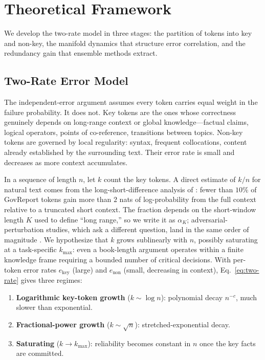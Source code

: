 \section{Theoretical Framework}
\label{sec:framework}

We develop the two-rate model in three stages: the partition of tokens into key and non-key, the manifold dynamics that structure error correlation, and the redundancy gain that ensemble methods extract.

\subsection{Two-Rate Error Model}

The independent-error argument assumes every token carries equal weight in the failure probability. It does not. Key tokens are the ones whose correctness genuinely depends on long-range context or global knowledge---factual claims, logical operators, points of co-reference, transitions between topics. Non-key tokens are governed by local regularity: syntax, frequent collocations, content already established by the surrounding text. Their error rate is small and decreases as more context accumulates.

In a sequence of length $n$, let $k$ count the key tokens. A direct estimate of $k/n$ for natural text comes from the long-short-difference analysis of \citet{fang2024what}: fewer than $10\%$ of GovReport tokens gain more than $2$ nats of log-probability from the full context relative to a truncated short context. The fraction depends on the short-window length $K$ used to define ``long range,'' so we write it as $\alpha_K$; adversarial-perturbation studies, which ask a different question, land in the same order of magnitude \citep{jin2020textfooler}. We hypothesize that $k$ grows sublinearly with $n$, possibly saturating at a task-specific $k_{\max}$: even a book-length argument operates within a finite knowledge frame requiring a bounded number of critical decisions. With per-token error rates $e_{\text{key}}$ (large) and $e_{\text{non}}$ (small, decreasing in context), Eq.~\ref{eq:two-rate} gives three regimes:

\begin{enumerate}
\setlength{\itemsep}{1pt}
\item \textbf{Logarithmic key-token growth} ($k \sim \log n$): polynomial decay $n^{-c}$, much slower than exponential.
\item \textbf{Fractional-power growth} ($k \sim \sqrt{n}$): stretched-exponential decay.
\item \textbf{Saturating} ($k \to k_{\max}$): reliability becomes constant in $n$ once the key facts are committed.
\end{enumerate}

